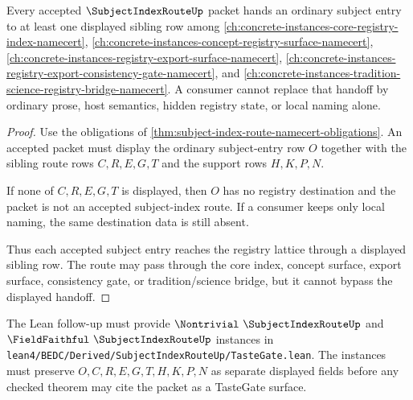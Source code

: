 \begin{theorem}
\label{thm:subject-index-route-registry-sibling-handoff}
Every accepted $\SubjectIndexRouteUp$ packet hands an ordinary subject entry to at least one displayed sibling row among \autoref{ch:concrete-instances-core-registry-index-namecert}, \autoref{ch:concrete-instances-concept-registry-surface-namecert}, \autoref{ch:concrete-instances-registry-export-surface-namecert}, \autoref{ch:concrete-instances-registry-export-consistency-gate-namecert}, and \autoref{ch:concrete-instances-tradition-science-registry-bridge-namecert}. A consumer cannot replace that handoff by ordinary prose, host semantics, hidden registry state, or local naming alone.
\end{theorem}
\begin{proof}
Use the obligations of \autoref{thm:subject-index-route-namecert-obligations}. An accepted packet must display the ordinary subject-entry row $O$ together with the sibling route rows $C,R,E,G,T$ and the support rows $H,K,P,N$.

If none of $C,R,E,G,T$ is displayed, then $O$ has no registry destination and the packet is not an accepted subject-index route. If a consumer keeps only local naming, the same destination data is still absent.

Thus each accepted subject entry reaches the registry lattice through a displayed sibling row. The route may pass through the core index, concept surface, export surface, consistency gate, or tradition/science bridge, but it cannot bypass the displayed handoff.
\end{proof}



The Lean follow-up must provide $\Nontrivial\ \SubjectIndexRouteUp$ and $\FieldFaithful\ \SubjectIndexRouteUp$ instances in \texttt{lean4/BEDC/Derived/SubjectIndexRouteUp/TasteGate.lean}. The instances must preserve $O,C,R,E,G,T,H,K,P,N$ as separate displayed fields before any checked theorem may cite the packet as a TasteGate surface.

